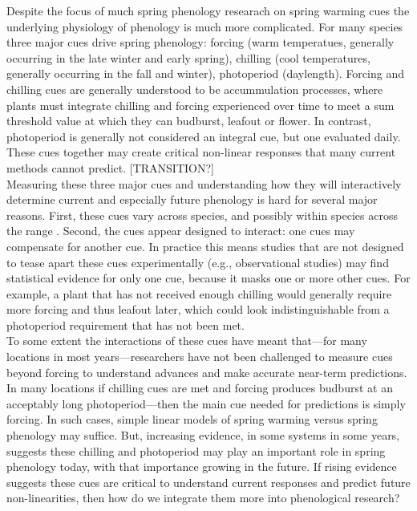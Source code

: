 \documentclass[11pt,letter]{article}
\begin{document}
Despite the focus of much spring phenology researach on spring warming cues the underlying physiology of phenology is much more complicated. For many species three major cues drive spring phenology: forcing (warm temperatues, generally occurring in the late winter and early spring), chilling (cool temperatures, generally occurring in the fall and winter), photoperiod (daylength). Forcing and chilling cues are generally understood to be accummulation processes, where plants must integrate chilling and forcing experienced over time to meet a sum threshold value at which they can budburst, leafout or flower. In contrast, photoperiod is generally not considered an integral cue, but one evaluated daily. These cues together may create critical non-linear responses that many current methods cannot predict. [TRANSITION?]\\

Measuring these three major cues and understanding how they will interactively determine current and especially future phenology is hard for several major reasons. First, these cues vary across species, and possibly within species across the range  \citep{vitasse2009,harrington2015}. Second, the cues appear designed to interact: one cues may compensate for another cue. In practice this means studies that are not designed to tease apart these cues experimentally (e.g., observational studies) may find statistical evidence for only one cue, because it masks one or more other cues. For example, a plant that has not received enough chilling would generally require more forcing and thus leafout later, which could look indistinguishable from a photoperiod requirement that has not been met. \\

To some extent the interactions of these cues have meant that---for many locations in most years---researchers have not been challenged to measure cues beyond forcing to understand advances and make accurate near-term predictions. In many locations if chilling cues are met and forcing produces budburst at an acceptably long photoperiod---then the main cue needed for predictions is simply forcing. In such cases, simple linear models of spring warming versus spring phenology may suffice. But, increasing evidence, in some systems in some years, suggests these chilling and photoperiod may play an important role in spring phenology today, with that importance growing in the future. If rising evidence suggests these cues are critical to understand current responses and predict future non-linearities, then how do we integrate them more into phenological research? \\%
\end{document}
